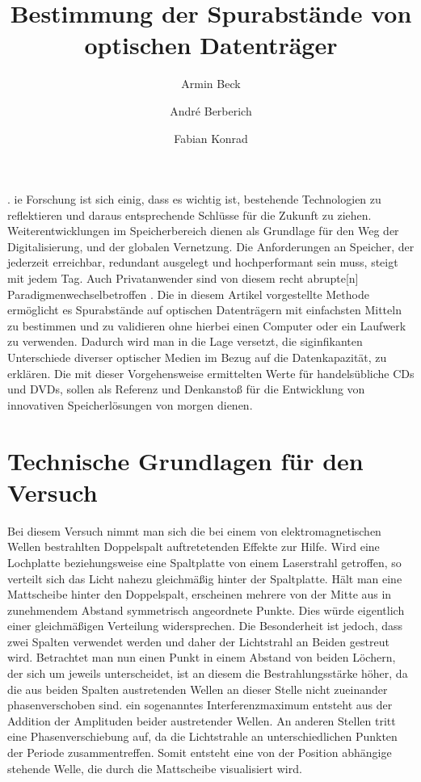 \documentclass[9pt,twocolumn,twoside]{pnas-new}
\title{Bestimmung der Spurabstände von optischen Datenträger}
\author[a]{Armin Beck}
\author[a]{André Berberich}
\author[a]{Fabian Konrad}
\affil[a]{Student der DHBW Mosbach}
\begin{document}
\verticaladjustment{-2pt}

\maketitle
\thispagestyle{firststyle}
.
ie Forschung ist sich einig, dass es wichtig ist, bestehende Technologien zu reflektieren und daraus entsprechende Schlüsse für die Zukunft zu ziehen. Weiterentwicklungen im Speicherbereich dienen als Grundlage für den Weg der Digitalisierung, und der globalen Vernetzung. 
Die Anforderungen an Speicher, der jederzeit erreichbar, redundant ausgelegt und hochperformant sein muss, steigt mit jedem Tag.
Auch Privatanwender sind von diesem \glqq recht abrupte[n] Paradigmenwechsel\grqq \space betroffen \cite[Heft 10/2012 S.102]{CT1990}.
Die in diesem Artikel vorgestellte Methode ermöglicht es Spurabstände auf optischen Datenträgern mit einfachsten Mitteln zu bestimmen und zu validieren ohne hierbei einen Computer oder ein Laufwerk zu verwenden. Dadurch wird man in die Lage versetzt, die siginfikanten Unterschiede diverser optischer Medien im Bezug auf die Datenkapazität, zu erklären.
Die mit dieser Vorgehensweise ermittelten Werte für handelsübliche CDs und DVDs, sollen als Referenz und Denkanstoß für die Entwicklung von innovativen Speicherlösungen von morgen dienen.

\section*{Technische Grundlagen für den Versuch}
Bei diesem Versuch nimmt man sich die bei einem von elektromagnetischen Wellen bestrahlten Doppelspalt auftretetenden Effekte zur Hilfe. Wird eine Lochplatte beziehungsweise eine Spaltplatte von einem Laserstrahl getroffen, so verteilt sich das Licht nahezu gleichmäßig hinter der Spaltplatte. Hält man eine Mattscheibe hinter den Doppelspalt, erscheinen mehrere von der Mitte aus in zunehmendem Abstand symmetrisch angeordnete Punkte. Dies würde eigentlich einer gleichmäßigen Verteilung widersprechen. Die Besonderheit ist jedoch, dass zwei Spalten verwendet werden und daher der Lichtstrahl an Beiden gestreut wird. Betrachtet man nun einen Punkt in einem Abstand von beiden Löchern, der sich um jeweils %
unterscheidet, ist an diesem die Bestrahlungsstärke höher, da die aus beiden Spalten austretenden Wellen an dieser Stelle nicht zueinander phasenverschoben sind. ein sogenanntes Interferenzmaximum entsteht aus der Addition der Amplituden beider austretender Wellen. An anderen Stellen tritt eine Phasenverschiebung auf, da die Lichtstrahle an unterschiedlichen Punkten der Periode zusammentreffen. Somit entsteht eine von der Position abhängige stehende Welle, die durch die Mattscheibe visualisiert wird.
\end{document}
